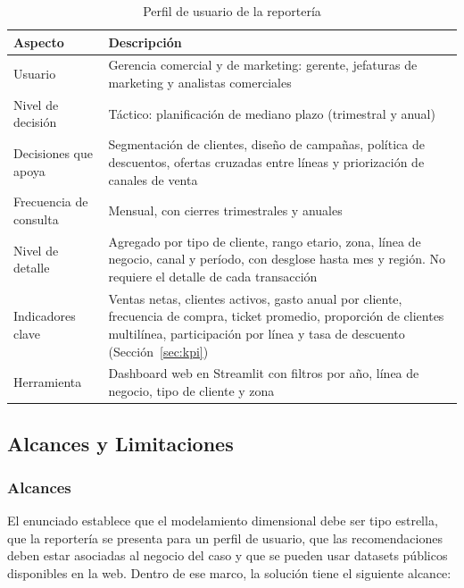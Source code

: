 \begin{table}[!htbp]
  \centering
  \caption{Perfil de usuario de la reportería}
  \label{tab:perfil}
  \small
  \begin{tabularx}{\linewidth}{@{}>{\raggedright\arraybackslash}p{3.4cm}
                                  >{\raggedright\arraybackslash}X@{}}
    \toprule
    \textbf{Aspecto} & \textbf{Descripción} \\
    \midrule
    Usuario & Gerencia comercial y de marketing: gerente, jefaturas de
      marketing y analistas comerciales \\
    Nivel de decisión & Táctico: planificación de mediano plazo (trimestral
      y anual) \\
    Decisiones que apoya & Segmentación de clientes, diseño de campañas,
      política de descuentos, ofertas cruzadas entre líneas y priorización de
      canales de venta \\
    Frecuencia de consulta & Mensual, con cierres trimestrales y anuales \\
    Nivel de detalle & Agregado por tipo de cliente, rango etario, zona,
      línea de negocio, canal y período, con desglose hasta mes y región. No
      requiere el detalle de cada transacción \\
    Indicadores clave & Ventas netas, clientes activos, gasto anual por
      cliente, frecuencia de compra, ticket promedio, proporción de clientes multilínea,
      participación por línea y tasa de descuento
      (Sección~\ref{sec:kpi}) \\
    Herramienta & Dashboard web en Streamlit con filtros por año, línea de
      negocio, tipo de cliente y zona \\
    \bottomrule
  \end{tabularx}
\end{table}

\subsection{Alcances y Limitaciones}

\subsubsection{Alcances}

El enunciado establece que el modelamiento dimensional debe ser tipo
estrella, que la reportería se presenta para un perfil de usuario, que las
recomendaciones deben estar asociadas al negocio del caso y que se pueden usar
datasets públicos disponibles en la web. Dentro de ese marco, la solución tiene
el siguiente alcance:

